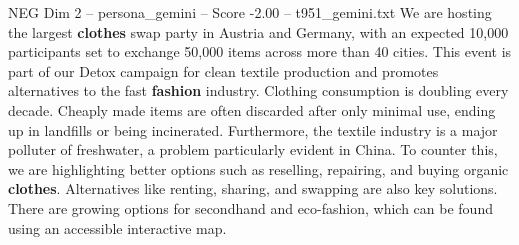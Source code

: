 \begin{textsample}{NEG Dim 2 – persona\_gemini – Score -2.00 – t951\_gemini.txt}  \label{ex:f2_neg_001}
We are hosting the largest \textbf{clothes} swap party in Austria and Germany, with an expected 10,000 participants set to exchange 50,000 items across more than 40 cities.
This event is part of our Detox campaign for clean textile production and promotes alternatives to the fast \textbf{fashion} industry.
Clothing consumption is doubling every decade.
Cheaply made items are often discarded after only minimal use, ending up in landfills or being incinerated.
Furthermore, the textile industry is a major polluter of freshwater, a problem particularly evident in China.
To counter this, we are highlighting better options such as reselling, repairing, and buying organic \textbf{clothes}.
Alternatives like renting, sharing, and swapping are also key solutions.
There are growing options for secondhand and eco-fashion, which can be found using an accessible interactive map.

\end{textsample}
